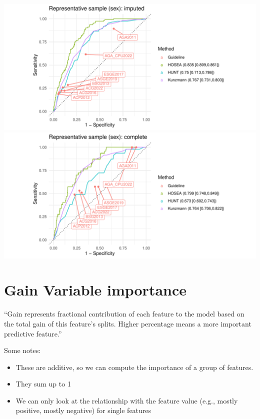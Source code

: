 \documentclass[12pt]{article}
\begin{document}
\clearpage

\begin{center}
\includegraphics[width=1.0\textwidth]{figures/comparison_sex_imputed.pdf}
\includegraphics[width=1.0\textwidth]{figures/comparison_sex_complete.pdf}
\end{center}



\clearpage

\section*{Gain Variable importance}

``Gain represents fractional contribution of each feature to the model based on the total gain of this feature's splits. 
Higher percentage means a more important predictive feature.''

Some notes:
\begin{itemize}
\item These are additive, so we can compute the importance of a group of features.
\item They sum up to 1
\item We can only look at the relationship with the feature value (e.g., mostly positive, mostly negative) for single features
\end{itemize}
\end{document}
